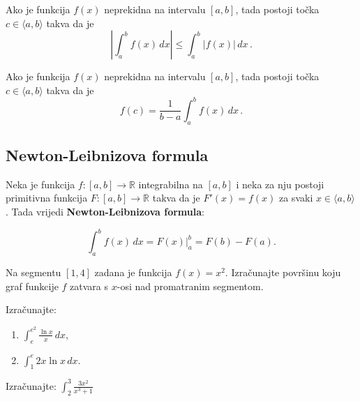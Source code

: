 \begin{proposition}
    Ako je funkcija $f(x)$ neprekidna na intervalu $[a, b]$, tada postoji točka $c \in \langle a, b\rangle$ takva da je
    $$
        \left|\int_a^b f(x)\,dx\right| \leq \int_a^b |f(x)|\,dx\,.
    $$
\end{proposition}

\begin{proposition}
    Ako je funkcija $f(x)$ neprekidna na intervalu $[a, b]$, tada postoji točka $c \in \langle a, b\rangle$ takva da je
    $$
        f(c) = \frac{1}{b-a}\int_a^b f(x)\,dx\,.
    $$
\end{proposition}

\subsection{Newton-Leibnizova formula}

Neka je funkcija $f: [a,b] \to \mathbb{R}$ integrabilna na $[a,b]$ i neka za nju postoji primitivna funkcija $F: [a,b] \to \mathbb{R}$ takva da je $F'(x)=f(x)$ za svaki $x\in \langle a, b \rangle$. Tada vrijedi \textbf{Newton-Leibnizova formula}:

$$
  \int_a^b f(x)\,dx=F(x)\Big|_a^b=F(b)-F(a).
$$

\begin{example}
    Na segmentu $[1,4]$ zadana je funkcija $f(x)=x^2$.
    Izračunajte površinu koju graf funkcije $f$ zatvara s $x$-osi nad promatranim segmentom.
\end{example}

\begin{example}
    Izračunajte:

    \begin{enumerate}
        \item $\displaystyle \int_e^{e^2} \frac{\ln x}{x}\,dx$,
        \item $\displaystyle \int_1^{e} 2x \ln x\,dx$.
    \end{enumerate}
\end{example}

\begin{example}
    Izračunajte: $\displaystyle \int_2^3 \frac{3x^2}{x^3+1}$
\end{example}
